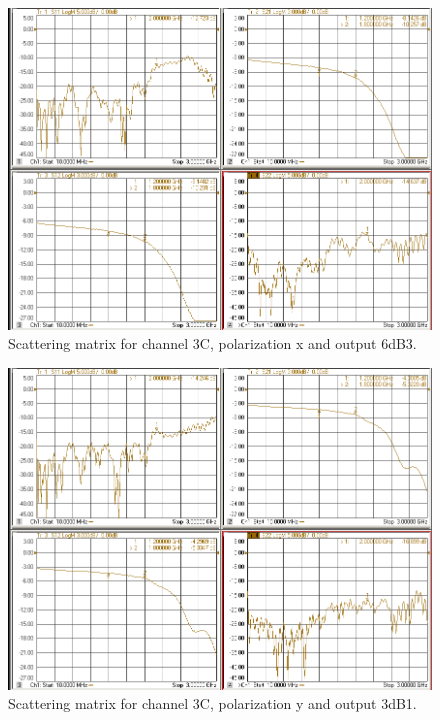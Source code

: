 \documentclass[12pt,a4paper,oneside]{article}
\begin{document}
\begin{figure}[H]
\centering
\includegraphics[width=0.9\linewidth]{VNA_results/3Cx_6dB3.png}
\caption{Scattering matrix for channel 3C, polarization x and output 6dB3.}
\label{fig:3Cx_6dB3}
\end{figure}


\begin{figure}[H]
\centering
\includegraphics[width=0.9\linewidth]{VNA_results/3Cy_3dB1.png}
\caption{Scattering matrix for channel 3C, polarization y and output 3dB1.}
\label{fig:3Cy_3dB1}
\end{figure}
\end{document}
